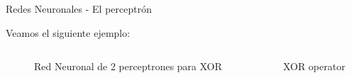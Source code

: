 \documentclass[9pt]{beamer}
\begin{document}
\begin{frame}{Redes Neuronales - El perceptrón}

Veamos el siguiente ejemplo: \pause

\begin{columns}

  \begin{column}{0.7\textwidth}

  \begin{figure}[H]
    \centering
    \caption{Red Neuronal de 2 perceptrones para XOR}
  \end{figure}

  \end{column}

  \begin{column}{0.3\textwidth}
  
  \hspace{0.4cm} XOR operator


  

  \end{column}

\end{columns} \pause


\end{frame}
\end{document}

